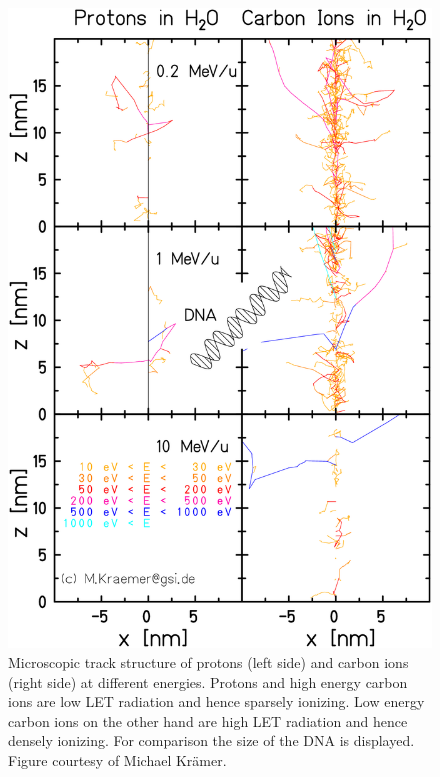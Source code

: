 \newpage

\vspace*{1cm}

\begin{figure}[H]
\begin{center}
\includegraphics[scale=0.25]{./teile/introduction/trackstructure.png}
\caption{Microscopic track structure of protons (left side) and carbon ions (right side) at different energies. Protons and high energy 
carbon ions are low LET radiation and hence sparsely ionizing. Low energy carbon ions on the other hand are high LET radiation and hence 
densely ionizing. For comparison the size of the DNA is displayed. Figure courtesy of Michael Kr\"amer.}
\label{track}
\end{center}
\end{figure}



